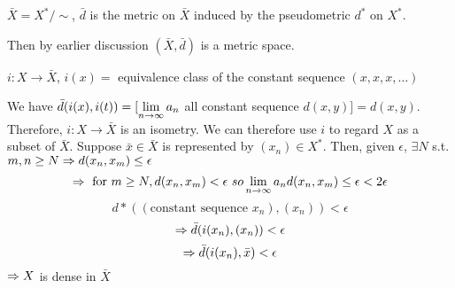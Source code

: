 \begin{mydef}
$\bar{X}=X^*/\sim$, $\bar{d}$ is the metric on $\bar{X}$ induced by the pseudometric $d^*$ on $X^*$.
\end{mydef}
Then by earlier discussion $(\bar{X},\bar{d})$ is a metric space.
\begin{mydef}
$i: X \to \bar{X}$, $i(x) = $ equivalence class of the constant sequence $(x,x,x,\ldots)$
\end{mydef}
We have $\bar{d}(i(x),i(t))=[\lim\limits_{n\to\infty} a_n$ all constant sequence $d(x,y)] = d(x,y)$. Therefore, $i:X\to\bar{X}$ is an isometry. We can therefore use $i$ to regard $X$ as a subset of $\bar{X}$. Suppose $\bar{x}\in\bar{X}$ is represented by $(x_n)\in X^*$. Then, given $\epsilon$, $\exists N$ s.t. $m,n\geq N\Rightarrow d(x_n,x_m)\leq\epsilon$
\[ \Rightarrow \text{ for } m\geq N, d(x_n,x_m)<\epsilon \ so \lim\limits_{n\to\infty} a_n d(x_n,x_m) \leq \epsilon < 2\epsilon \]
\[ d*((\text{constant sequence } x_n),(x_n))<\epsilon \]
\[ \Rightarrow \bar{d}(i(x_n),(x_n)) < \epsilon \]
\[ \Rightarrow \bar{d}(i(x_n),\bar{x}) < \epsilon \]
$\Rightarrow X$ is dense in $\bar{X}$

